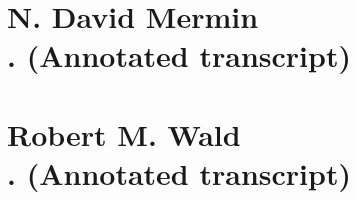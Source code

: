 \documentclass[english, 11pt]{book}
\begin{document}
\frontmatter%

%

%	
\tableofcontents

\mainmatter%

\part{N. David Mermin\\ {\small {}. (Annotated transcript)}}


\part{Robert M. Wald\\ {\small {}. (Annotated transcript)}}

%



\backmatter%
%
\printindex

\end{document}
